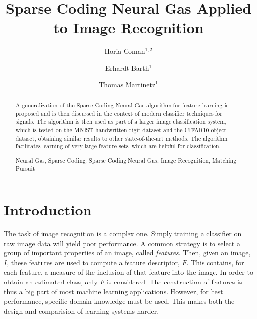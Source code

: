 \documentclass[runningheads,a4paper]{llncs}
\newcommand{\keywords}[1]{\par\addvspace\baselineskip
\noindent\keywordname\enspace\ignorespaces#1}
\begin{document}
\mainmatter

\title{Sparse Coding Neural Gas Applied to Image Recognition}

\author{Horia Coman$^{1,2}$ \and Erhardt Barth$^{1}$ \and Thomas Martinetz$^{1}$}



\maketitle

\begin{abstract} A generalization of the Sparse Coding Neural Gas algorithm for feature learning is proposed and is then discussed in the context of modern classifier techniques for signals. The algorithm is then used as part of a larger image classification system, which is tested on the MNIST handwritten digit dataset and the CIFAR10 object dataset, obtaining similar results to other state-of-the-art methods. The algorithm facilitates learning of very large feature sets, which are helpful for classification.
\keywords{Neural Gas, Sparse Coding, Sparse Coding Neural Gas, Image Recognition, Matching Pursuit}
\end{abstract}

\section{Introduction}

The task of image recognition is a complex one. Simply training a classifier on raw image data will yield poor performance. A common strategy is to select a group of important properties of an image, called \emph{features}. Then, given an image, $I$, these features are used to compute a feature descriptor, $F$. This contains, for each feature, a measure of the inclusion of that feature into the image. In order to obtain an estimated class, only $F$ is considered. The construction of features is thus a big part of most machine learning applications. However, for best performance, specific domain knowledge must be used. This makes both the design and comparision of learning systems harder.
\end{document}
